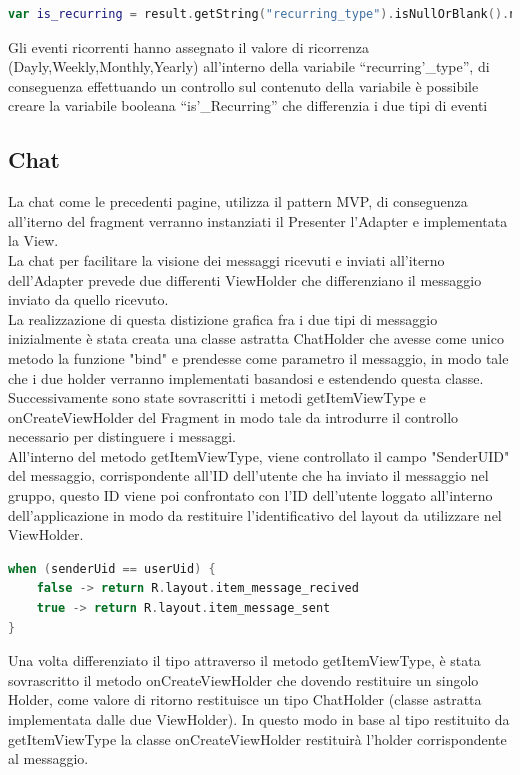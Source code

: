\begin{lstlisting}[language=kotlin,caption={Linea di codice del modello Event}]
   var is_recurring = result.getString("recurring_type").isNullOrBlank().not()
\end{lstlisting}

Gli eventi ricorrenti hanno assegnato il valore di ricorrenza (Dayly,Weekly,Monthly,Yearly) all'interno della variabile ``recurring'\_type'', di conseguenza effettuando un controllo sul contenuto della variabile è possibile creare la variabile booleana ``is'\_Recurring'' che differenzia i due tipi di eventi

\newpage

\subsection{Chat}
La chat come le precedenti pagine, utilizza il pattern MVP, di conseguenza all'iterno del fragment verranno instanziati il Presenter l'Adapter e implementata la View.\\
La chat per facilitare la visione dei messaggi ricevuti e inviati all'iterno dell'Adapter prevede due differenti ViewHolder che differenziano il messaggio inviato da quello ricevuto.\\
La realizzazione di questa distizione grafica fra i due tipi di messaggio inizialmente è stata creata una classe astratta ChatHolder che avesse come unico metodo la funzione "bind" e prendesse come parametro il messaggio, in modo tale che i due holder verranno implementati basandosi e estendendo questa classe.\\
Successivamente sono state sovrascritti i metodi getItemViewType e onCreateViewHolder del Fragment in modo tale da introdurre il controllo necessario per distinguere i messaggi.\\
All'interno del metodo getItemViewType, viene controllato il campo "SenderUID" del messaggio, corrispondente all'ID dell'utente che ha inviato il messaggio nel gruppo, questo ID viene poi confrontato con l'ID dell'utente loggato all'interno dell'applicazione in modo da restituire l'identificativo del layout da utilizzare nel ViewHolder.
\begin{lstlisting}[language=kotlin,caption={Logica della funzione getItemViewType della Chat}]
when (senderUid == userUid) {
    false -> return R.layout.item_message_recived
    true -> return R.layout.item_message_sent
}
\end{lstlisting}
Una volta differenziato il tipo attraverso il metodo getItemViewType, è stata sovrascritto il metodo onCreateViewHolder che dovendo restituire un singolo Holder, come valore di ritorno restituisce un tipo ChatHolder (classe astratta implementata dalle due ViewHolder). In questo modo in base al tipo restituito da getItemViewType la classe onCreateViewHolder restituirà l'holder corrispondente al messaggio.
